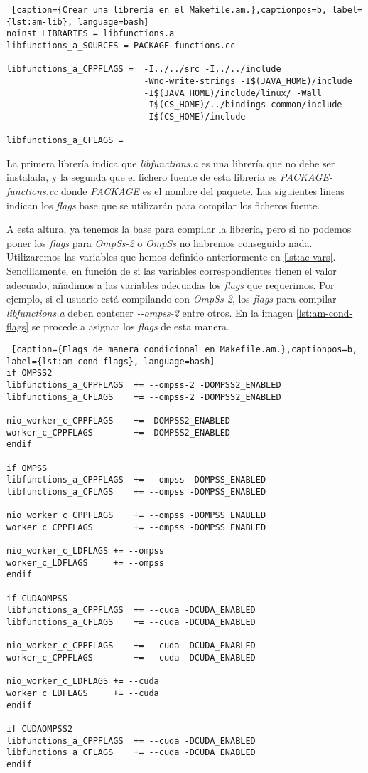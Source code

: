 \begin{lstlisting} [caption={Crear una librería en el Makefile.am.},captionpos=b, label={lst:am-lib}, language=bash]
noinst_LIBRARIES = libfunctions.a
libfunctions_a_SOURCES = PACKAGE-functions.cc

libfunctions_a_CPPFLAGS =  -I../../src -I../../include
                           -Wno-write-strings -I$(JAVA_HOME)/include 
                           -I$(JAVA_HOME)/include/linux/ -Wall
                           -I$(CS_HOME)/../bindings-common/include
                           -I$(CS_HOME)/include 

libfunctions_a_CFLAGS =
\end{lstlisting}
\smallskip

La primera librería indica que \textit{libfunctions.a} es una librería que no debe ser instalada, y la segunda que el fichero fuente de esta librería es \textit{PACKAGE-functions.cc} donde \textit{PACKAGE} es el nombre del paquete. Las siguientes líneas indican los \textit{flags} base que se utilizarán para compilar los ficheros fuente. 
\smallskip

A esta altura, ya tenemos la base para compilar la librería, pero si no podemos poner los \textit{flags} para \textit{OmpSs-2} o \textit{OmpSs} no habremos conseguido nada. Utilizaremos las variables que hemos definido anteriormente en \ref{lst:ac-vars}. Sencillamente, en función de si las variables correspondientes tienen el valor adecuado, añadimos a las variables adecuadas los \textit{flags} que requerimos. Por ejemplo, si el usuario está compilando con \textit{OmpSs-2}, los \textit{flags} para compilar \textit{libfunctions.a} deben contener \textit{-{}-ompss-2} entre otros. En la imagen \ref{lst:am-cond-flags} se procede a asignar los \textit{flags} de esta manera.

\smallskip
\begin{lstlisting} [caption={Flags de manera condicional en Makefile.am.},captionpos=b, label={lst:am-cond-flags}, language=bash]
if OMPSS2
libfunctions_a_CPPFLAGS  += --ompss-2 -DOMPSS2_ENABLED
libfunctions_a_CFLAGS    += --ompss-2 -DOMPSS2_ENABLED

nio_worker_c_CPPFLAGS    += -DOMPSS2_ENABLED
worker_c_CPPFLAGS        += -DOMPSS2_ENABLED
endif

if OMPSS
libfunctions_a_CPPFLAGS  += --ompss -DOMPSS_ENABLED
libfunctions_a_CFLAGS    += --ompss -DOMPSS_ENABLED

nio_worker_c_CPPFLAGS    += --ompss -DOMPSS_ENABLED
worker_c_CPPFLAGS        += --ompss -DOMPSS_ENABLED

nio_worker_c_LDFLAGS += --ompss
worker_c_LDFLAGS     += --ompss
endif

if CUDAOMPSS
libfunctions_a_CPPFLAGS  += --cuda -DCUDA_ENABLED
libfunctions_a_CFLAGS    += --cuda -DCUDA_ENABLED

nio_worker_c_CPPFLAGS    += --cuda -DCUDA_ENABLED
worker_c_CPPFLAGS        += --cuda -DCUDA_ENABLED

nio_worker_c_LDFLAGS += --cuda
worker_c_LDFLAGS     += --cuda
endif

if CUDAOMPSS2
libfunctions_a_CPPFLAGS  += --cuda -DCUDA_ENABLED
libfunctions_a_CFLAGS    += --cuda -DCUDA_ENABLED
endif
\end{lstlisting}
\smallskip

